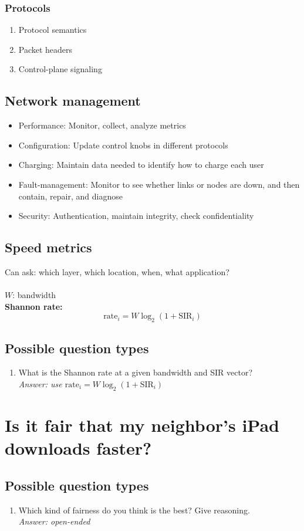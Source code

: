 \documentclass{article}
\begin{document}
\subsubsection{Protocols}
\begin{enumerate}
\item Protocol semantics
\item Packet headers
\item Control-plane signaling
\end{enumerate}

\subsection{Network management}

\begin{itemize}
\item Performance: Monitor, collect, analyze metrics
\item Configuration: Update control knobs in different protocols
\item Charging: Maintain data needed to identify how to charge each user
\item Fault-management: Monitor to see whether links or nodes are down, and then contain, repair, and diagnose
\item Security: Authentication, maintain integrity, check confidentiality
\end{itemize}

\subsection{Speed metrics}

Can ask: which layer, which location, when, what application? \\
\\
$W$: bandwidth \\
\textbf{Shannon rate:}
$$ \text{rate}_i = W \log_2(1 + \text{SIR}_i) $$

\subsection{Possible question types}

\begin{enumerate}
\item What is the Shannon rate at a given bandwidth and SIR vector? \\
\textit{Answer: use $\text{rate}_i = W \log_2(1 + \text{SIR}_i)$}
\end{enumerate}

\section{Is it fair that my neighbor's iPad downloads faster?}

\subsection{Possible question types}

\begin{enumerate}
\item Which kind of fairness do you think is the best? Give reasoning. \\
\textit{Answer: open-ended}
\end{enumerate}
\end{document}
